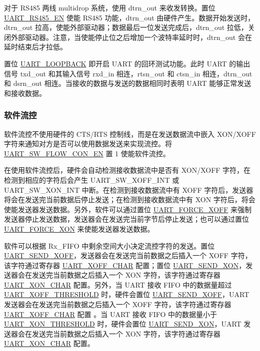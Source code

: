 \documentclass[main\_\_CN.tex]{subfiles}
\begin{document}
对于 RS485 两线 multidrop 系统，使用 dtrn\_out 来收发转换。置位 \hyperref[fielddesc:UARTRS485EN]{UART\_RS485\_EN} 使能 RS485 功能，dtrn\_out 由硬件产生。数据开始发送时，dtrn\_out 拉高，使能外部驱动器；数据最后一位发送完成后，dtrn\_out 拉低，关闭外部驱动器。注意，当使能停止位之后增加一个波特率延时时，dtrn\_out 会在延时结束后才拉低。

置位 \hyperref[fielddesc:UARTLOOPBACK]{UART\_LOOPBACK} 即开启 UART 的回环测试功能。此时 UART 的输出信号 txd\_out 和其输入信号 rxd\_in 相连，rtsn\_out 和 ctsn\_in 相连，dtrn\_out 和 dsrn\_out 相连。当接收的数据与发送的数据相同时表明 UART 能够正常发送和接收数据。

\subsubsection{软件流控}

软件流控不使用硬件的 CTS/RTS 控制线，而是在发送数据流中嵌入 XON/XOFF 字符来通知对方是否可以使用数据发送来实现流控。将 \hyperref[fielddesc:UARTSWFLOWCONEN]{UART\_SW\_FLOW\_CON\_EN} 置 1 使能软件流控。

在使用软件流控后，硬件会自动检测接收数据流中是否有 XON/XOFF 字符，在检测到相应的字符后会产生 UART\_SW\_XOFF\_INT 或 UART\_SW\_XON\_INT 中断。在检测到接收数据流中有 XOFF 字符后，发送器将会在发送完当前数据后停止发送；在检测到接收数据流中有 XON 字符后，将会使能发送器发送数据。另外，软件可以通过置位 \hyperref[fielddesc:UARTFORCEXOFF]{UART\_FORCE\_XOFF} 来强制发送器停止发送数据，发送器会在发送完当前字节后停止发送；也可以通过置位 \hyperref[fielddesc:UARTFORCEXON]{UART\_FORCE\_XON} 来使能发送器发送数据。

软件可以根据 Rx\_FIFO 中剩余空间大小决定流控字符的发送。置位 \hyperref[fielddesc:UARTSENDXOFF]{UART\_SEND\_XOFF}，发送器会在发送完当前数据之后插入一个 XOFF 字符，该字符通过寄存器 \hyperref[fielddesc:UARTXOFFCHAR]{UART\_XOFF\_CHAR} 配置；置位 \hyperref[fielddesc:UARTSENDXON]{UART\_SEND\_XON}，发送器会在发送完当前数据之后插入一个 XON 字符，该字符通过寄存器  \hyperref[fielddesc:UARTXONCHAR]{UART\_XON\_CHAR} 配置。另外，当 UART 接收 FIFO 中的数据量超过 \hyperref[fielddesc:UARTXOFFTHRESHOLD]{UART\_XOFF\_THRESHOLD} 时，硬件会置位 \hyperref[fielddesc:UARTSENDXOFF]{UART\_SEND\_XOFF}，UART 发送器会在发送完当前数据之后插入一个 XOFF 字符，该字符通过寄存器 \hyperref[fielddesc:UARTXOFFCHAR]{UART\_XOFF\_CHAR} 配置 。当 UART 接收 FIFO 中的数据量小于 \hyperref[fielddesc:UARTXONTHRESHOLD]{UART\_XON\_THRESHOLD} 时，硬件会置位 \hyperref[fielddesc:UARTSENDXON]{UART\_SEND\_XON}，UART 发送器会在发送完当前数据之后插入一个 XON 字符，该字符通过寄存器 \hyperref[fielddesc:UARTXONCHAR]{UART\_XON\_CHAR} 配置。
\end{document}
